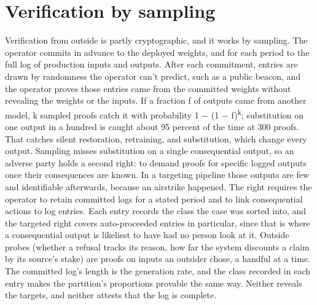 \section{Verification by sampling}
\label{sec:13.5}
Verification from outside is partly cryptographic, and it works by sampling. The operator commits in advance to the deployed weights, and for each period to the full log of production inputs and outputs. After each commitment, entries are drawn by randomness the operator can't predict, such as a public beacon, and the operator proves those entries came from the committed weights without revealing the weights or the inputs. If a fraction f of outputs came from another model, k sampled proofs catch it with probability 1 − (1 − f)\textsuperscript{k}; substitution on one output in a hundred is caught about 95 percent of the time at 300 proofs. That catches silent restoration, retraining, and substitution, which change every output. Sampling misses substitution on a single consequential output, so an adverse party holds a second right: to demand proofs for specific logged outputs once their consequences are known. In a targeting pipeline those outputs are few and identifiable afterwards, because an airstrike happened. The right requires the operator to retain committed logs for a stated period and to link consequential actions to log entries. Each entry records the class the case was sorted into, and the targeted right covers auto-proceeded entries in particular, since that is where a consequential output is likeliest to have had no person look at it. Outside probes (whether a refusal tracks its reason, how far the system discounts a claim by its source's stake) are proofs on inputs an outsider chose, a handful at a time. The committed log's length is the generation rate, and the class recorded in each entry makes the partition's proportions provable the same way. Neither reveals the targets, and neither attests that the log is complete.

